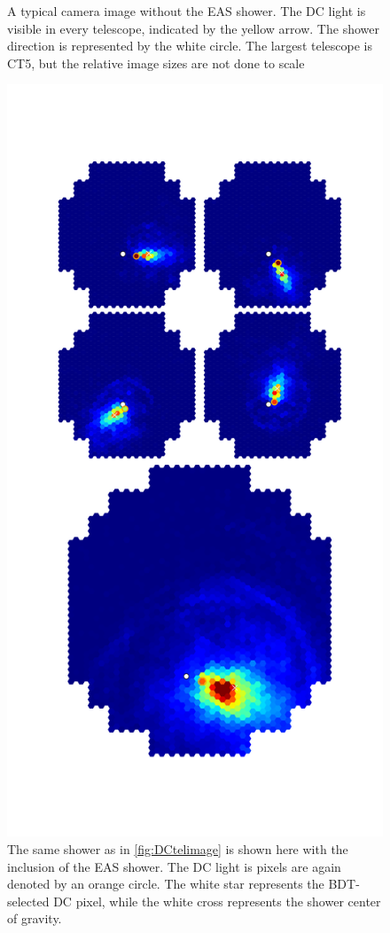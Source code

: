 \documentclass[]{article}
\begin{document}
\begin{figure}
\begin{minipage}{0.45\textwidth}
\caption{A typical camera image without the EAS shower. The DC light is visible in every telescope, indicated by the yellow arrow. The shower direction is represented by the white circle. The largest telescope is CT5, but the relative image sizes are not done to scale}
\label{fig:DCtelimage}
\end{minipage}\hfill
\begin{minipage}{0.45\textwidth}
\centering
\includegraphics[trim=80 120 80 150,clip,width=\textwidth]{graphfull}
\caption{The same shower as in \ref{fig:DCtelimage} is shown here with the inclusion of the EAS shower. The DC light is pixels are again denoted by an orange circle. The white star represents the BDT-selected DC pixel, while the white cross represents the shower center of gravity.}
\label{fig:cutdistribution2}
\end{minipage}
\restoregeometry
\end{figure}
\end{document}
